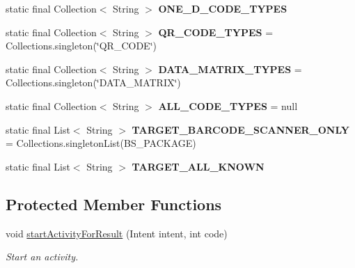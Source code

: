\begin{DoxyCompactItemize}
\item 
static final Collection$<$ String $>$ {\bfseries O\-N\-E\-\_\-\-D\-\_\-\-C\-O\-D\-E\-\_\-\-T\-Y\-P\-E\-S}
\item 
\hypertarget{classcom_1_1lakehead_1_1textbookmarket_1_1_intent_integrator_ab85a5aacbbd62973bf21e751b6a0b502}{static final Collection$<$ String $>$ {\bfseries Q\-R\-\_\-\-C\-O\-D\-E\-\_\-\-T\-Y\-P\-E\-S} = Collections.\-singleton(\char`\"{}Q\-R\-\_\-\-C\-O\-D\-E\char`\"{})}\label{classcom_1_1lakehead_1_1textbookmarket_1_1_intent_integrator_ab85a5aacbbd62973bf21e751b6a0b502}

\item 
\hypertarget{classcom_1_1lakehead_1_1textbookmarket_1_1_intent_integrator_a9f7bae3a6dfb010ba0999823afd282d3}{static final Collection$<$ String $>$ {\bfseries D\-A\-T\-A\-\_\-\-M\-A\-T\-R\-I\-X\-\_\-\-T\-Y\-P\-E\-S} = Collections.\-singleton(\char`\"{}D\-A\-T\-A\-\_\-\-M\-A\-T\-R\-I\-X\char`\"{})}\label{classcom_1_1lakehead_1_1textbookmarket_1_1_intent_integrator_a9f7bae3a6dfb010ba0999823afd282d3}

\item 
\hypertarget{classcom_1_1lakehead_1_1textbookmarket_1_1_intent_integrator_a62d7e9b00329a0a8e922fb252751ad66}{static final Collection$<$ String $>$ {\bfseries A\-L\-L\-\_\-\-C\-O\-D\-E\-\_\-\-T\-Y\-P\-E\-S} = null}\label{classcom_1_1lakehead_1_1textbookmarket_1_1_intent_integrator_a62d7e9b00329a0a8e922fb252751ad66}

\item 
\hypertarget{classcom_1_1lakehead_1_1textbookmarket_1_1_intent_integrator_a02bcbea6314160ce11579f28d61fa6d8}{static final List$<$ String $>$ {\bfseries T\-A\-R\-G\-E\-T\-\_\-\-B\-A\-R\-C\-O\-D\-E\-\_\-\-S\-C\-A\-N\-N\-E\-R\-\_\-\-O\-N\-L\-Y} = Collections.\-singleton\-List(B\-S\-\_\-\-P\-A\-C\-K\-A\-G\-E)}\label{classcom_1_1lakehead_1_1textbookmarket_1_1_intent_integrator_a02bcbea6314160ce11579f28d61fa6d8}

\item 
static final List$<$ String $>$ {\bfseries T\-A\-R\-G\-E\-T\-\_\-\-A\-L\-L\-\_\-\-K\-N\-O\-W\-N}
\end{DoxyCompactItemize}
\subsection*{Protected Member Functions}
\begin{DoxyCompactItemize}
\item 
void \hyperlink{classcom_1_1lakehead_1_1textbookmarket_1_1_intent_integrator_a970ad896b35a6a0e449152a70b7c5fd3}{start\-Activity\-For\-Result} (Intent intent, int code)
\begin{DoxyCompactList}\small\item\em Start an activity. \end{DoxyCompactList}\end{DoxyCompactItemize}


